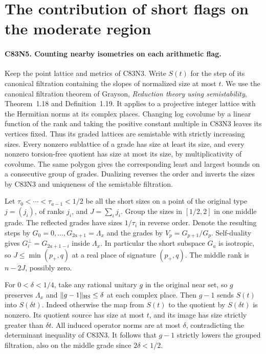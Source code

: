 \section{The contribution of short flags on the moderate region}

\paragraph{C83N5. Counting nearby isometries on each arithmetic flag.}
Keep the point lattice and metrics of C83N3. Write $S(t)$ for the step
of its canonical filtration containing the slopes of normalized size
at most $t$. We use the canonical filtration theorem of Grayson,
\emph{Reduction theory using semistability}, Theorem~1.18 and
Definition~1.19. It applies to a projective integer lattice with the
Hermitian norms at its complex places. Changing log covolume by a
linear function of the rank and taking the positive constant multiple
in C83N3 leaves its vertices fixed. Thus its graded lattices are
semistable with strictly increasing sizes. Every nonzero sublattice
of a grade has size at least its size, and every nonzero torsion-free
quotient has size at most its size, by multiplicativity of covolume.
The same polygon gives the corresponding least and largest bounds on a
consecutive group of grades. Dualizing reverses the order and inverts
the sizes by C83N3 and uniqueness of the semistable filtration.

Let $\tau_0<\cdots<\tau_{a-1}<1/2$ be all the short sizes on a point
of the original type $j=(j_i)$, of ranks $j_i$, and $J=\sum_i j_i$.
Group the sizes in $[1/2,2]$ in one middle grade. The reflected
grades have sizes $1/\tau_i$ in reverse order. Denote the resulting
steps by $G_0=0,\ldots,G_{2a+1}=\Lambda_x$ and the grades by
$V_p=G_{p+1}/G_p$. Self-duality gives
$G_i^\perp=G_{2a+1-i}$ inside $\Lambda_x$. In particular the short
subspace $G_a$ is isotropic, so $J\le\min(p_+,q)$ at a real place
of signature $(p_+,q)$. The middle rank is $n-2J$, possibly zero.

For $0<\delta<1/4$, take any rational unitary $g$ in the original
near set, so $g$ preserves $\Lambda_x$ and $\|g-1\|_{\rm HS}\le\delta$
at each complex place. Then $g-1$ sends $S(t)$ into $S(\delta t)$.
Indeed otherwise the map from $S(t)$ to the quotient by
$S(\delta t)$ is nonzero. Its quotient source has size at most
$t$, and its image has size strictly greater than $\delta t$.
All induced operator norms are at most $\delta$, contradicting the
determinant inequality of C83N3. It follows that $g-1$ strictly lowers
the grouped filtration, also on the middle grade since $2\delta<1/2$.

